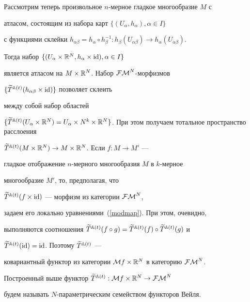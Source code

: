 Рассмотрим теперь произвольное $n$-мерное гладкое многообразие $M$ с


атласом, состоящим из набора карт $\{(U_\alpha,h_\alpha),\alpha\in I\}$


с функциями склейки $h_{\alpha\beta}=h_\alpha\circ


h^{-1}_\beta:h_\beta(U_{\alpha\beta})\to h_\alpha(U_{\alpha\beta})$.


Тогда набор $\{(U_\alpha\times{\Bbb R}^N,h_\alpha\times\operatorname{id}),\alpha\in I\}$


является атласом на $M\times{\Bbb R}^N$. Набор ${\cal{FM}}^N$-морфизмов


$\{\widetilde T{}^{{\Bbb A}(t)}(h_{\alpha\beta}\times\operatorname{id})\}$ позволяет склеить


между собой набор областей


$\{\widetilde T{}^{\A(t)}(U_\alpha\times\R^N)=U_\alpha\times


N^k\times\R^N\}$. При этом получаем тотальное пространство расслоения


$\widetilde T{}^{{\Bbb A}(t)}(M\times{\Bbb R}^N)\rightarrow M\times{\Bbb R}^N$. Если $f:M\to M'$ ---


гладкое отображение $n$-мерного многообразия $M$ в $k$-мерное


многообразие $M'$, то, предполагая, что


$\widetilde T{}^{{\Bbb A}(t)}(f\times\operatorname{id})$ --- морфизм из категории ${\cal{FM}}^N$,


задаем его локально уравнениями~(\ref{modmap}). При этом, очевидно,


выполняются соотношения $\widetilde T{}^{\A(t)}(f\circ


g)=\widetilde T{}^{\A(t)}(f)\circ\widetilde T{}^{\A(t)}(g)$ и


$\widetilde T{}^{{\Bbb A}(t)}(\operatorname{id})=\operatorname{id}$. Поэтому $\widetilde T{}^{{\Bbb A}(t)}$ ---


ковариантный функтор из категории ${\cal M} f\times{\Bbb R}^N$ в категорию ${\cal{FM}}^N$.








\begin{defn}


Построенный выше функтор $\widetilde T{}^{{\Bbb A}(t)}:{\cal M} f\times{\Bbb R}^N\rightarrow{\cal{FM}}^N$


будем называть $N$-параметрическим семейством функторов Вейля.


\end{defn}





